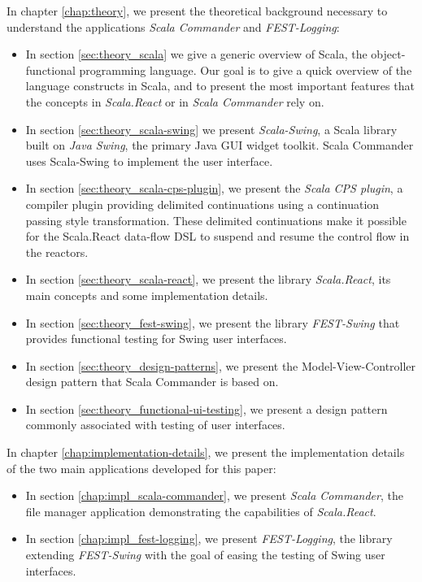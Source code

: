 In chapter \ref{chap:theory}, we present the theoretical background necessary to understand the applications \emph{Scala Commander} and \emph{FEST-Logging}:
\begin{itemize}
\item In section \ref{sec:theory_scala} we give a generic overview of Scala, the object-functional programming language. Our goal is to give a quick overview of the language constructs in Scala, and to present the most important features that the concepts in \emph{Scala.React} or in \emph{Scala Commander} rely on. %

\item In section \ref{sec:theory_scala-swing} we present \emph{Scala-Swing}\cite{ScalaSwing}, a Scala library built on \emph{Java Swing}, the primary Java GUI widget toolkit. \cite{Robinson:1999:SWI:554530} Scala Commander uses Scala-Swing to implement the user interface.

\item In section \ref{sec:theory_scala-cps-plugin}, we present the \emph{Scala CPS plugin}, a compiler plugin providing delimited continuations using a continuation passing style transformation. These delimited continuations make it possible for the Scala.React data-flow DSL to suspend and resume the control flow in the reactors.

\item In section \ref{sec:theory_scala-react}, we present the library \emph{Scala.React}, its main concepts and some implementation details.

\item In section \ref{sec:theory_fest-swing}, we present the library \emph{FEST-Swing} that provides functional testing for Swing user interfaces.

\item In section \ref{sec:theory_design-patterns}, we present the Model-View-Controller design pattern that Scala Commander is based on.

\item In section \ref{sec:theory_functional-ui-testing}, we present a design pattern commonly associated with testing of user interfaces.
\end{itemize}

In chapter \ref{chap:implementation-details}, we present the implementation details of the two main applications developed for this paper:
\begin{itemize}
\item In section \ref{chap:impl_scala-commander}, we present \emph{Scala Commander}, the file manager application demonstrating the capabilities of \emph{Scala.React}.
\item In section \ref{chap:impl_fest-logging}, we present \emph{FEST-Logging}, the library extending \emph{FEST-Swing} with the goal of easing the testing of Swing user interfaces.
\end{itemize}







